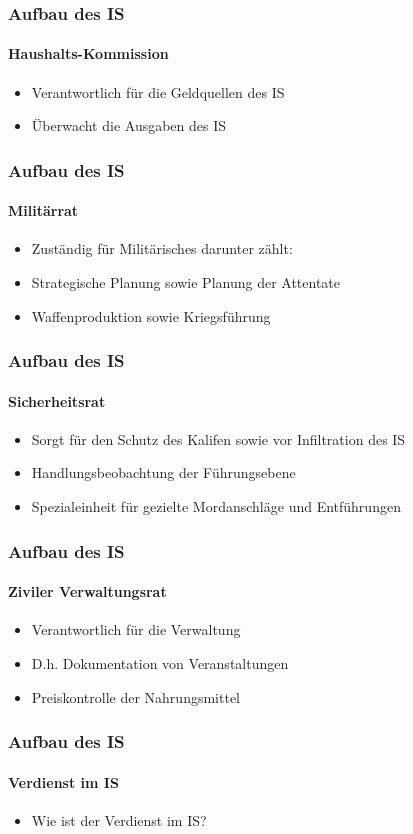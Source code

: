 \documentclass[10pt,a4paper]{beamer}
\begin{document}
\begin{frame}
\frametitle{Aufbau des IS}
\framesubtitle{Haushalts-Kommission}
\begin{itemize}
	\item Verantwortlich für die Geldquellen des IS
	\pause
	\item Überwacht die Ausgaben des IS
\end{itemize}
\end{frame}

\begin{frame}
\frametitle{Aufbau des IS}
\framesubtitle{Militärrat}
\begin{itemize}
	\item Zuständig für Militärisches darunter zählt:
	\pause
	\item Strategische Planung sowie Planung der Attentate
	\pause
	\item Waffenproduktion sowie Kriegsführung
\end{itemize}
\end{frame}

\begin{frame}
\frametitle{Aufbau des IS}
\framesubtitle{Sicherheitsrat}
\begin{itemize}
	\item Sorgt für den Schutz des Kalifen sowie vor Infiltration des IS
	\pause
	\item Handlungsbeobachtung der Führungsebene
	\pause
	\item Spezialeinheit für gezielte Mordanschläge und Entführungen
\end{itemize}
\end{frame}

\begin{frame}
\frametitle{Aufbau des IS}
\framesubtitle{Ziviler Verwaltungsrat}
\begin{itemize}
	\item Verantwortlich für die Verwaltung
	\pause
	\item D.h. Dokumentation von Veranstaltungen
	\pause
	\item Preiskontrolle der Nahrungsmittel
\end{itemize}
\end{frame}

\begin{frame}
\frametitle{Aufbau des IS}
\framesubtitle{Verdienst im IS}
\begin{itemize}
	\item Wie ist der Verdienst im IS?
\end{itemize}
\end{frame}

\begin{frame}
\titlepage
\end{frame}
\end{document}
